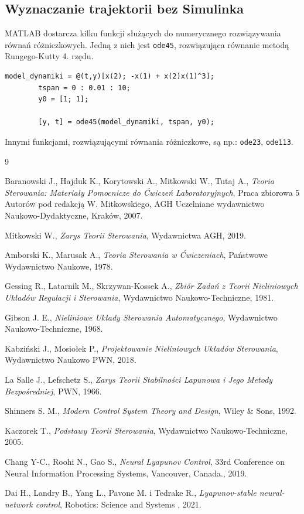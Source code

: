 \documentclass{article}
\begin{document}
    \subsection{Wyznaczanie trajektorii bez Simulinka}
    MATLAB dostarcza kilku funkcji służących do numerycznego rozwiązywania równań różniczkowych.
    Jedną z nich jest \texttt{ode45}, rozwiązująca równanie metodą Rungego-Kutty 4. rzędu.
    \begin{lstlisting}[style=Matlab-editor]
        model_dynamiki = @(t,y)[x(2); -x(1) + x(2)x(1)^3];
        tspan = 0 : 0.01 : 10;
        y0 = [1; 1];
        
        [y, t] = ode45(model_dynamiki, tspan, y0);
    \end{lstlisting}
    Innymi funkcjami, rozwiązującymi równania różniczkowe, są np.: \texttt{ode23}, \texttt{ode113}.

\newpage
\begin{thebibliography}{9}

  Baranowski J., Hajduk K., Korytowski A., Mitkowski W., Tutaj A.,
  \emph{Teoria Sterowania: Materiały Pomocnicze do Ćwiczeń Laboratoryjnych},
  Praca zbiorowa 5 Autorów pod redakcją W. Mitkowskiego,
  AGH Uczelniane wydawnictwo Naukowo-Dydaktyczne,
  Kraków, 2007.

    Mitkowski W.,
    \emph{Zarys Teorii Sterowania},
    Wydawnictwa AGH,
    2019.

  Amborski K., Marusak A.,
  \emph{Teoria Sterowania w Ćwiczeniach},
  Państwowe Wydawnictwo Naukowe,
  1978.

  Gessing R., Latarnik M., Skrzywan-Kossek A.,
  \emph{Zbiór Zadań z Teorii Nieliniowych Układów Regulacji i Sterowania},
  Wydawnictwo Naukowo-Techniczne,
  1981.

  Gibson J. E.,
  \emph{Nieliniowe Układy Sterowania Automatycznego},
  Wydawnictwo Naukowo-Techniczne,
  1968.

  Kabziński J., Mosiołek P.,
  \emph{Projektowanie Nieliniowych Układów Sterowania},
  Wydawnictwo Naukowo PWN,
  2018.

  La Salle J., Lefschetz S.,
  \emph{Zarys Teorii Stabilności Lapunowa i Jego Metody Bezpośredniej},
  PWN,
  1966.

  Shinners S. M.,
  \emph{Modern Control System Theory and Design},
  Wiley \& Sons,
  1992.

  Kaczorek T.,
  \emph{Podstawy Teorii Sterowania},
  Wydawnictwo Naukowo-Techniczne,
  2005.

  Chang Y-C., Roohi N., Gao S., 
  \emph{Neural Lyapunov Control},
  33rd Conference on Neural Information Processing Systems, Vancouver, Canada.,
  2019.

  Dai H., Landry B., Yang L., Pavone M. i Tedrake R.,
  \emph{Lyapunov-stable neural-network control},
  Robotics: Science and Systems ,
  2021.

\end{thebibliography}
\end{document}
